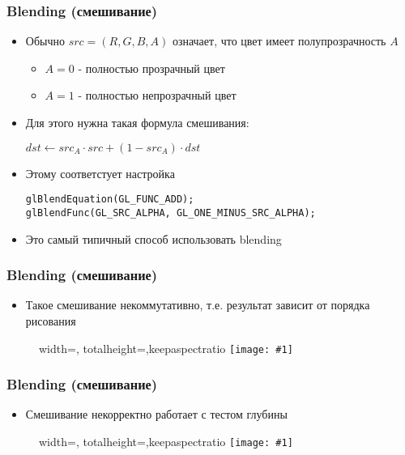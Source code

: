 \documentclass{beamer}
\newcommand{\slideimage}[1]{
  \begin{figure}
    \begin{adjustbox}{width=\textwidth, totalheight=\textheight-2\baselineskip-2\baselineskip,keepaspectratio}
      \texttt{[image: \#1]}
    \end{adjustbox}
  \end{figure}
}
\begin{document}
\begin{frame}[fragile]
\frametitle{Blending (смешивание)}
\begin{itemize}
\item Обычно \begin{math}src=(R,G,B,A)\end{math} означает, что цвет имеет полупрозрачность \begin{math}A\end{math}
\begin{itemize}
\item \begin{math}A=0\end{math} - полностью прозрачный цвет
\item \begin{math}A=1\end{math} - полностью непрозрачный цвет
\end{itemize}
\pause
\item Для этого нужна такая формула смешивания:
\begin{center}
\begin{math}
dst \leftarrow src_A \cdot src + (1 - src_A) \cdot dst
\end{math}
\end{center}
\pause
\item Этому соответстует настройка
\begin{verbatim}
glBlendEquation(GL_FUNC_ADD);
glBlendFunc(GL_SRC_ALPHA, GL_ONE_MINUS_SRC_ALPHA);
\end{verbatim}
\pause
\item Это самый типичный способ использовать blending
\end{itemize}
\end{frame}

\begin{frame}[fragile]
\frametitle{Blending (смешивание)}
\begin{itemize}
\item Такое смешивание некоммутативно, т.е. результат зависит от порядка рисования
\end{itemize}
\slideimage{two-squares.png}
\end{frame}

\begin{frame}[fragile]
\frametitle{Blending (смешивание)}
\begin{itemize}
\item Смешивание некорректно работает с тестом глубины
\end{itemize}
\slideimage{blending_incorrect_order.png}
\end{frame}
\end{document}
